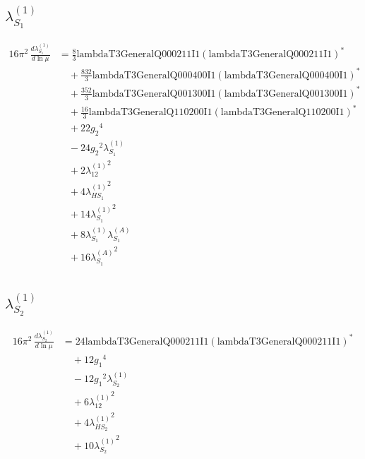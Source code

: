 \documentclass[10pt,a4paper]{article}
\begin{document}
\subsection*{$\lambda_{S_1}^{(1)}$}
\begin{align*}
16\pi^2\,\frac{d \lambda_{S_1}^{(1)}}{d\ln\mu} &=\frac{8}{3} \text{lambdaT3GeneralQ000211I1} \left(\text{lambdaT3GeneralQ000211I1}\right)^{*} \\
&\quad +\frac{832}{3} \text{lambdaT3GeneralQ000400I1} \left(\text{lambdaT3GeneralQ000400I1}\right)^{*} \\
&\quad +\frac{352}{3} \text{lambdaT3GeneralQ001300I1} \left(\text{lambdaT3GeneralQ001300I1}\right)^{*} \\
&\quad +\frac{16}{3} \text{lambdaT3GeneralQ110200I1} \left(\text{lambdaT3GeneralQ110200I1}\right)^{*} \\
&\quad +22 {g_2}^4 \\
&\quad -24 {g_2}^2 {\lambda_{S_1}^{(1)}} \\
&\quad +2 {\lambda_{12}^{(1)}}^2 \\
&\quad +4 {\lambda_{HS_1}^{(1)}}^2 \\
&\quad +14 {\lambda_{S_1}^{(1)}}^2 \\
&\quad +8 {\lambda_{S_1}^{(1)}} {\lambda_{S_1}^{(A)}} \\
&\quad +16 {\lambda_{S_1}^{(A)}}^2 \\
\end{align*}
\subsection*{$\lambda_{S_2}^{(1)}$}
\begin{align*}
16\pi^2\,\frac{d \lambda_{S_2}^{(1)}}{d\ln\mu} &=24 \text{lambdaT3GeneralQ000211I1} \left(\text{lambdaT3GeneralQ000211I1}\right)^{*} \\
&\quad +12 {g_1}^4 \\
&\quad -12 {g_1}^2 {\lambda_{S_2}^{(1)}} \\
&\quad +6 {\lambda_{12}^{(1)}}^2 \\
&\quad +4 {\lambda_{HS_2}^{(1)}}^2 \\
&\quad +10 {\lambda_{S_2}^{(1)}}^2 \\
\end{align*}
\end{document}
